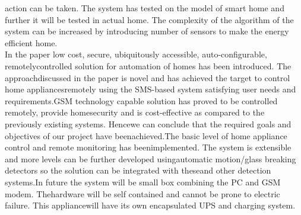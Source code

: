 \documentclass[twoside,a4paper,16pt]{book}
\begin{document}
{{ action can be taken.
 The system has tested on the model of smart home and further it will be tested in actual
 home. The complexity of the algorithm of the system can be increased by introducing number
 of sensors to make the energy efficient home.
\\
 In the paper low cost, secure, ubiquitously accessible, auto-configurable, remotelycontrolled solution for automation of homes has been introduced. The approachdiscussed in the paper is novel and has achieved the target to control home appliancesremotely using the SMS-based system satisfying user needs and requirements.GSM technology capable solution has proved to be controlled remotely, provide homesecurity and is cost-effective as compared to the previously existing systems. Hencewe can conclude that the required goals and objectives of our project have beenachieved.The basic level of home appliance control and remote monitoring has beenimplemented. The system is extensible and more levels can be further developed usingautomatic motion/glass breaking detectors so the solution can be integrated with theseand other detection systems.In future the system will be small box combining the PC and GSM modem. Thehardware will be self contained and cannot be prone to electric failure. This appliancewill have its own encapsulated UPS and charging system.
}}
\end{document}
